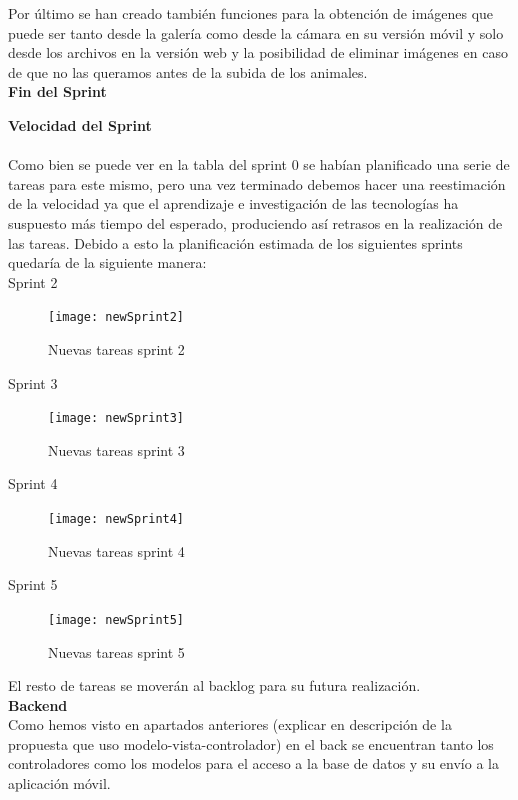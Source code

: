 Por último se han creado también funciones para la obtención de imágenes que puede ser tanto desde la galería como desde la cámara en su versión móvil y solo desde los archivos en la versión web y la posibilidad de eliminar imágenes en caso de que no las queramos antes de la subida de los animales.\\

\Large{\textbf{Fin del Sprint}}

\textbf{Velocidad del Sprint} \\ \\
	Como bien se puede ver en la tabla del sprint 0 se habían planificado una serie de tareas para este mismo, pero una vez terminado debemos hacer una reestimación de la velocidad ya que el aprendizaje e investigación de las tecnologías ha suspuesto más tiempo del esperado, produciendo así retrasos en la realización de las tareas. Debido a esto la planificación estimada de los siguientes sprints quedaría de la siguiente manera: \\
	
	Sprint 2 \\
	\begin{figure}[H]
		\centering
		\texttt{[image: newSprint2]}
		\caption{Nuevas tareas sprint 2}
		\label{fig:newsprint2}
	\end{figure}
	
	
	Sprint 3 \\
	\begin{figure}[H]
		\centering
		\texttt{[image: newSprint3]}
		\caption{Nuevas tareas sprint 3}
		\label{fig:newsprint3}
	\end{figure}
	
	Sprint 4 \\
	\begin{figure}[H]
		\centering
		\texttt{[image: newSprint4]}
		\caption{Nuevas tareas sprint 4}
		\label{fig:newsprint4}
	\end{figure}
	
	
	Sprint 5 \\ 
	\begin{figure}[H]
		\centering
		\texttt{[image: newSprint5]}
		\caption{Nuevas tareas sprint 5}
		\label{fig:newsprint5}
	\end{figure}
	
	El resto de tareas se moverán al backlog para su futura realización. \\ 
	
	\textbf{Backend} \\
	
	Como hemos visto en apartados anteriores (explicar en descripción de la propuesta que uso modelo-vista-controlador) en el back se encuentran tanto los controladores como los modelos para el acceso a la base de datos y su envío a la aplicación móvil. \\
	
